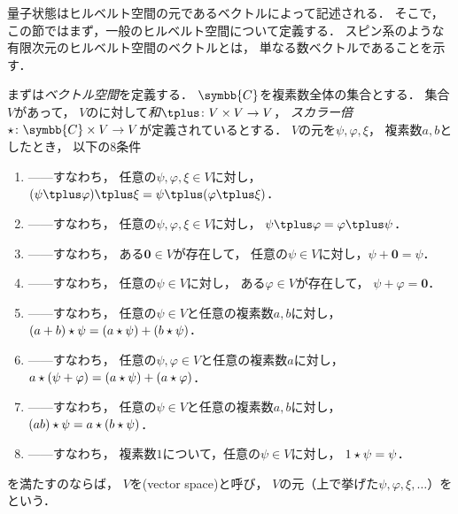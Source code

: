 \documentclass{sotsu}
\newcommand{\fire}[1]{\textcolor{fire}{#1}}
\newcommand{\water}[1]{\textcolor{water}{#1}}
\begin{document}
量子状態はヒルベルト空間の元であるベクトルによって記述される．
そこで，この節ではまず，一般のヒルベルト空間について定義する．
スピン系のような有限次元のヒルベルト空間のベクトルとは，
単なる数ベクトルであることを示す．

まずは\emph{ベクトル空間}を定義する．
$\symbb{C}$を複素数全体の集合とする．
集合$V$があって，
$V$のに対して\emph{和}$\vecplus \colon V \times V \to V$，
\emph{スカラー倍}$\scaprod \colon \symbb{C} \times V \to V$が定義されているとする．
$V$の元を$\psi, \varphi, \xi$，
複素数$a, b$としたとき，
以下の8条件
\begin{enumerate}
    \item \label{vector:sum-associative}
        ------すなわち，
        \fire{任意の$\psi, \varphi, \xi \in V$}に対し，
        $(\psi \vecplus \varphi) \vecplus \xi = \psi \vecplus (\varphi \vecplus \xi)$．
    \item \label{vector:sum-commutative}
        ------すなわち，
        \fire{任意の$\psi, \varphi, \xi \in V$}に対し，
        $\psi \vecplus \varphi = \varphi \vecplus \psi$．
    \item \label{vector:sum-zero}
        ------すなわち，
        \water{ある$\symbf{0} \in V$}が存在して，
        \fire{任意の$\psi \in V$}に対し，$\psi + \symbf{0} = \psi$．
    \item \label{vector:sum-opposite}
        ------すなわち，
        \fire{任意の$\psi \in V$}に対し，
        \water{ある$\varphi \in V$}が存在して，
        $\psi + \varphi = \symbf{0}$．
    \item \label{vector:scalar-sum}
        ------すなわち，
        \fire{任意の$\psi \in V$}と\fire{任意の複素数$a, b$}に対し，
        $(a + b) \mathbin{\star} \psi = (a \mathbin{\star} \psi) + (b \mathbin{\star} \psi)$．
    \item \label{vector:scalar-distributive}
        ------すなわち，
        \fire{任意の$\psi, \varphi \in V$}と\fire{任意の複素数$a$}に対し，
        $a \mathbin{\star} (\psi + \varphi) = (a \mathbin{\star} \psi) + (a \mathbin{\star} \varphi)$．
    \item \label{vector:scalar-prod}
        ------すなわち，
        \fire{任意の$\psi \in V$}と\fire{任意の複素数$a, b$}に対し，
        $(ab) \mathbin{\star} \psi = a \mathbin{\star} (b \mathbin{\star} \psi)$．
    \item \label{vector:scalar-identity}
        ------すなわち，
        複素数$1$について，\fire{任意の$\psi \in V$}に対し，
        $1 \mathbin{\star} \psi = \psi$．
\end{enumerate}
を満たすのならば，
$V$を(vector space)と呼び，
$V$の元（上で挙げた$\psi, \varphi, \xi, \dotsc$）をという．
\end{document}

